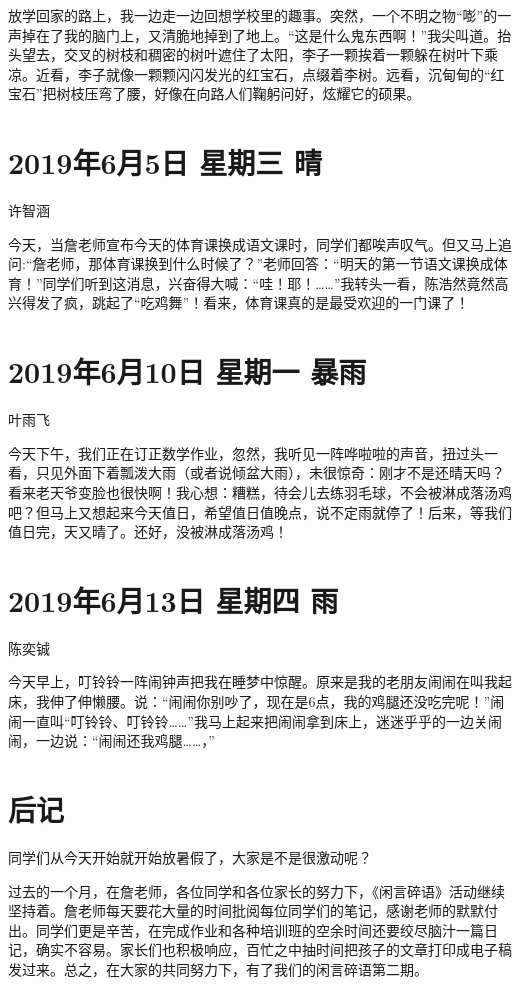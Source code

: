 放学回家的路上，我一边走一边回想学校里的趣事。突然，一个不明之物``嘭''的一声掉在了我的脑门上，又清脆地掉到了地上。``这是什么鬼东西啊！''我尖叫道。抬头望去，交叉的树枝和稠密的树叶遮住了太阳，李子一颗挨着一颗躲在树叶下乘凉。近看，李子就像一颗颗闪闪发光的红宝石，点缀着李树。远看，沉甸甸的``红宝石''把树枝压弯了腰，好像在向路人们鞠躬问好，炫耀它的硕果。

\section{2019年6月5日 星期三 晴}

许智涵

今天，当詹老师宣布今天的体育课换成语文课时，同学们都唉声叹气。但又马上追问:``詹老师，那体育课换到什么时候了？''老师回答：``明天的第一节语文课换成体育！''同学们听到这消息，兴奋得大喊：``哇！耶！\ldots\ldots{}''我转头一看，陈浩然竟然高兴得发了疯，跳起了``吃鸡舞''！看来，体育课真的是最受欢迎的一门课了！

\section{2019年6月10日 星期一 暴雨}

叶雨飞

今天下午，我们正在订正数学作业，忽然，我听见一阵哗啦啦的声音，扭过头一看，只见外面下着瓢泼大雨（或者说倾盆大雨），未很惊奇：刚才不是还晴天吗？看来老天爷变脸也很快啊！我心想：糟糕，待会儿去练羽毛球，不会被淋成落汤鸡吧？但马上又想起来今天值日，希望值日值晚点，说不定雨就停了！后来，等我们值日完，天又晴了。还好，没被淋成落汤鸡！

\section{2019年6月13日 星期四 雨}

陈奕铖

今天早上，叮铃铃一阵闹钟声把我在睡梦中惊醒。原来是我的老朋友闹闹在叫我起床，我伸了伸懒腰。说：``闹闹你别吵了，现在是6点，我的鸡腿还没吃完呢！''闹闹一直叫``叮铃铃、叮铃铃\ldots\ldots{}''我马上起来把闹闹拿到床上，迷迷乎乎的一边关闹闹，一边说：``闹闹还我鸡腿\ldots\ldots，''

\section{后记}

同学们从今天开始就开始放暑假了，大家是不是很激动呢？

过去的一个月，在詹老师，各位同学和各位家长的努力下，《闲言碎语》活动继续坚持着。詹老师每天要花大量的时间批阅每位同学们的笔记，感谢老师的默默付出。同学们更是辛苦，在完成作业和各种培训班的空余时间还要绞尽脑汁一篇日记，确实不容易。家长们也积极响应，百忙之中抽时间把孩子的文章打印成电子稿发过来。总之，在大家的共同努力下，有了我们的闲言碎语第二期。

